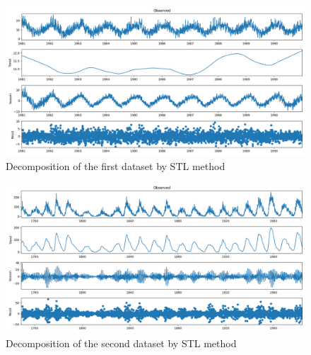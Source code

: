 \begin{figure}[H]
    \centering
    \begin{minipage}[b]{1\textwidth}
        \includegraphics[width=\textwidth]{figures/Ass1/Ass1_D1_STL.png}
    \end{minipage}
    \caption{Decomposition of the first dataset by STL method}
    \label{fig:Ass1_D1_STL}
\end{figure}

\begin{figure}[H]
    \centering
    \begin{minipage}[b]{1\textwidth}
        \includegraphics[width=\textwidth]{figures/Ass1/Ass1_D2_STL.png}
    \end{minipage}
    \caption{Decomposition of the second dataset by STL method}
    \label{fig:Ass1_D2_STL}
\end{figure}

